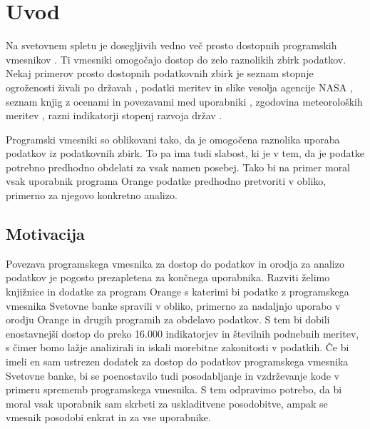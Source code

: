 
\chapter{Uvod}

Na svetovnem spletu je dosegljivih vedno več prosto dostopnih programskih
vmesnikov .
Ti vmesniki omogočajo dostop
do zelo raznolikih zbirk podatkov. Nekaj primerov prosto dostopnih podatkovnih
zbirk je seznam stopnje ogroženosti živali po državah 
    ,
podatki meritev in slike vesolja agencije NASA
    ,
seznam knjig z ocenami in povezavami med uporabniki 
    ,
zgodovina meteoroloških meritev 
    ,
razni indikatorji stopenj razvoja držav
    .

Programski vmesniki so oblikovani tako, da je omogočena raznolika uporaba
podatkov iz podatkovnih zbirk. To pa ima tudi slabost, ki je v tem, da je 
podatke potrebno predhodno obdelati za vsak namen posebej. Tako bi na primer 
moral vsak uporabnik programa Orange podatke predhodno pretvoriti v obliko, 
primerno za njegovo konkretno analizo.


\section{Motivacija}


Povezava programskega vmesnika za dostop do podatkov in orodja za analizo 
podatkov je pogosto prezapletena za končnega uporabnika. Razviti želimo
knjižnice in dodatke za program Orange s katerimi bi podatke z programskega
vmesnika Svetovne banke spravili v  obliko, primerno za nadaljnjo
uporabo v orodju Orange in drugih programih za obdelavo podatkov. S tem bi
dobili enostavnejši dostop do preko 16.000 indikatorjev in številnih podnebnih
meritev, s čimer bomo lažje analizirali in iskali morebitne zakonitosti v
podatkih. Če bi imeli en sam ustrezen dodatek za dostop do podatkov
programskega vmesnika Svetovne banke, bi se poenostavilo tudi posodabljanje in
vzdrževanje kode v primeru sprememb programskega vmesnika. S tem odpravimo
potrebo, da bi moral vsak uporabnik sam skrbeti za uskladitvene posodobitve,
ampak se vmesnik posodobi enkrat in za vse uporabnike.


